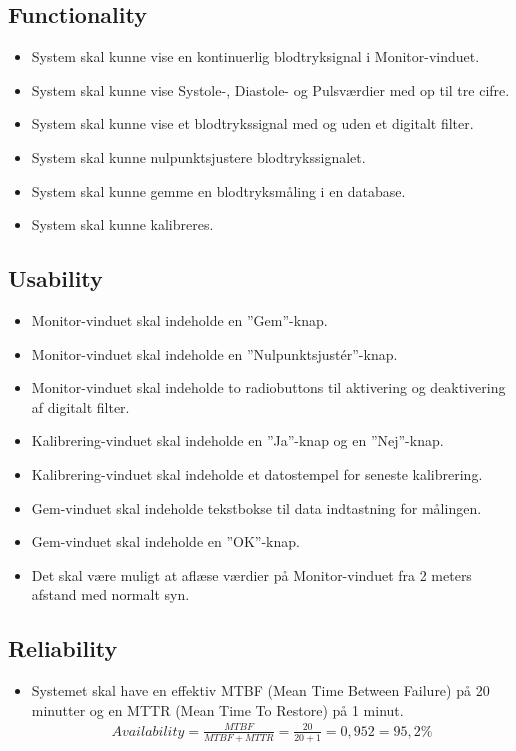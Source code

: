 \subsection{Functionality}
\begin{itemize}
	\item System skal kunne vise en kontinuerlig blodtryksignal i Monitor-vinduet.
	\item System skal kunne vise Systole-, Diastole- og Pulsværdier med op til tre cifre.
	\item System skal kunne vise et blodtrykssignal med og uden et digitalt filter.
	\item System skal kunne nulpunktsjustere blodtrykssignalet.
	\item System skal kunne gemme en blodtryksmåling i en database.
	\item System skal kunne kalibreres. 
\end{itemize}

\subsection{Usability}
\begin{itemize}
	\item Monitor-vinduet skal indeholde en ”Gem”\--knap.
	\item Monitor-vinduet skal indeholde en ”Nulpunktsjustér”\--knap.
	\item Monitor-vinduet skal indeholde to radiobuttons til aktivering og deaktivering af digitalt filter.
	\item Kalibrering-vinduet skal indeholde en ”Ja”\--knap og en ”Nej”\--knap.
	\item Kalibrering-vinduet skal indeholde et datostempel for seneste kalibrering.
	\item Gem-vinduet skal indeholde tekstbokse til data indtastning for målingen. 
	\item Gem-vinduet skal indeholde en ”OK”\--knap.
	\item Det skal være muligt at aflæse værdier på Monitor-vinduet fra 2 meters afstand med normalt syn.
\end{itemize}

\subsection{Reliability}
\begin{itemize}
	\item Systemet skal have en effektiv MTBF (Mean Time Between Failure) på 20 minutter og en MTTR (Mean Time To Restore) på 1 minut.
				\begin{align}
					Availability = \frac{MTBF}{MTBF+MTTR} = \frac{20}{20+1} = 0,952 = 95,2 \%
				\end{align}

\end{itemize}

